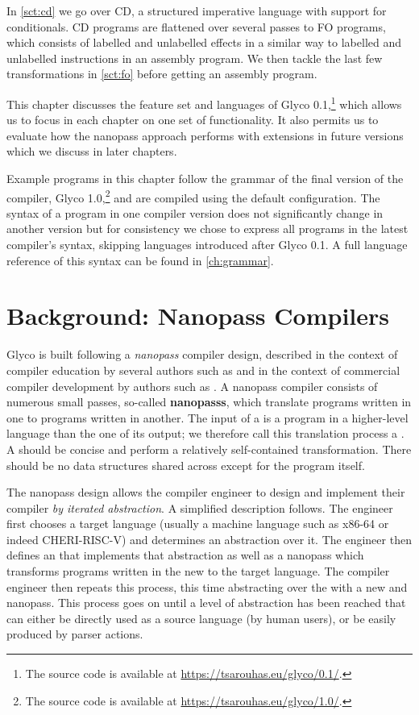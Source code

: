 \documentclass[main.tex]{subfiles}
\begin{document}
In \cref{sct:cd} we go over CD, a structured imperative language with support for conditionals. CD programs are flattened over several passes to FO programs, which consists of labelled and unlabelled effects in a similar way to labelled and unlabelled instructions in an assembly program. We then tackle the last few transformations in \cref{sct:fo} before getting an assembly program.

This chapter discusses the feature set and languages of Glyco 0.1,\footnote{The source code is available at \url{https://tsarouhas.eu/glyco/0.1/}.} which allows us to focus in each chapter on one set of functionality. It also permits us to evaluate how the nanopass approach performs with extensions in future versions which we discuss in later chapters.

Example programs in this chapter follow the grammar of the final version of the compiler, Glyco 1.0,\footnote{The source code is available at \url{https://tsarouhas.eu/glyco/1.0/}.} and are compiled using the default configuration. The syntax of a program in one compiler version does not significantly change in another version but for consistency we chose to express all programs in the latest compiler's syntax, skipping languages introduced after Glyco 0.1. A full language reference of this syntax can be found in \cref{ch:grammar}. 

\section{Background: Nanopass Compilers} \label{sct:nanopass}
Glyco is built following a \emph{nanopass} compiler design, described in the context of compiler education by several authors such as \cite{educomp} and in the context of commercial compiler development by authors such as \cite{commcomp}. A nanopass compiler consists of numerous small passes, so-called \textbf{\glspl{nanopass}}, which translate programs written in one \textbf{} to programs written in another. The input of a  is a program in a higher-level language than the one of its output; we therefore call this translation process a \textbf{}. A  should be concise and perform a relatively self-contained transformation. There should be no data structures shared across  except for the program itself.

The nanopass design allows the compiler engineer to design and implement their compiler \emph{by iterated abstraction}. A simplified description follows. The engineer first chooses a target language (usually a machine language such as x86-64 or indeed CHERI-RISC-V) and determines an abstraction over it. The engineer then defines an  that implements that abstraction as well as a \gls{nanopass} which transforms programs written in the new  to the target language. The compiler engineer then repeats this process, this time abstracting over the  with a new  and \gls{nanopass}. This process goes on until a level of abstraction has been reached that can either be directly used as a source language (by human users), or be easily produced by parser actions.
\end{document}
